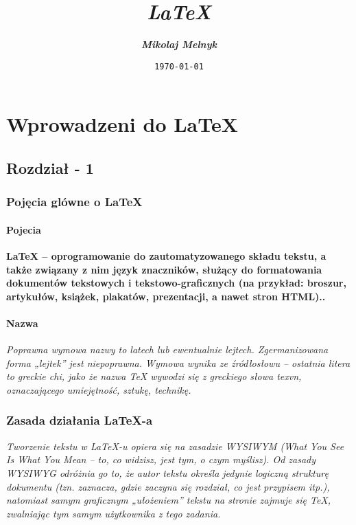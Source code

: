 \documentclass[a4paper,12pt]{scrbook}
\author{\textbf{\textit{Mikolaj Melnyk}}}
\title{\textit{\LaTeX}}
\date{\texttt{\today}}
\begin{document}
	
\maketitle
\tableofcontents{}
\part{Wprowadzeni do \LaTeX}
	
\chapter{Rozdział - 1}	
\section{Pojęcia glówne o \LaTeX}

\subsection{Pojecia}
	
\textbf{LaTeX – oprogramowanie do zautomatyzowanego składu tekstu, a także związany z nim język znaczników, służący do formatowania dokumentów tekstowych i tekstowo-graficznych (na przykład: broszur, artykułów, książek, plakatów, prezentacji, a nawet stron HTML)..}
	
\subsection{Nazwa}
	
\textsl{Poprawna wymowa nazwy to latech lub ewentualnie lejtech. Zgermanizowana forma „lejtek” jest niepoprawna. Wymowa wynika ze źródłosłowu – ostatnia litera to greckie chi, jako że nazwa TeX wywodzi się z greckiego słowa texvn, oznaczającego umiejętność, sztukę, technikę.}
	
	
\section{Zasada działania LaTeX-a}
	
\textit{Tworzenie tekstu w LaTeX-u opiera się na zasadzie WYSIWYM (What You See Is What You Mean – to, co widzisz, jest tym, o czym myślisz). Od zasady WYSIWYG odróżnia go to, że autor tekstu określa jedynie logiczną strukturę dokumentu (tzn. zaznacza, gdzie zaczyna się rozdział, co jest przypisem itp.), natomiast samym graficznym „ułożeniem” tekstu na stronie zajmuje się TeX, zwalniając tym samym użytkownika z tego zadania.	
}
	
\end{document}
